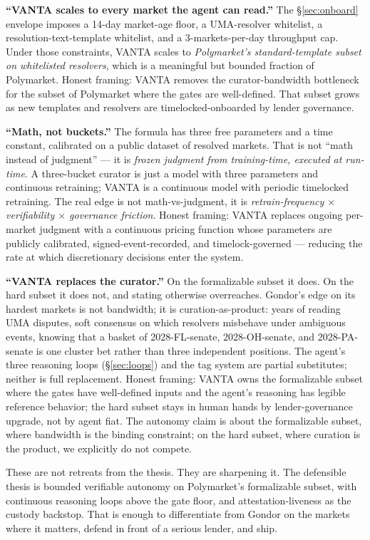 \documentclass[11pt,letterpaper]{article}
\begin{document}
\textbf{``VANTA scales to every market the agent can read.''} The \S\ref{sec:onboard} envelope imposes a 14-day market-age floor, a UMA-resolver whitelist, a resolution-text-template whitelist, and a 3-markets-per-day throughput cap. Under those constraints, VANTA scales to \emph{Polymarket's standard-template subset on whitelisted resolvers}, which is a meaningful but bounded fraction of Polymarket. Honest framing: VANTA removes the curator-bandwidth bottleneck for the subset of Polymarket where the gates are well-defined. That subset grows as new templates and resolvers are timelocked-onboarded by lender governance.

\textbf{``Math, not buckets.''} The formula has three free parameters and a time constant, calibrated on a public dataset of resolved markets. That is not ``math instead of judgment'' --- it is \emph{frozen judgment from training-time, executed at run-time}. A three-bucket curator is just a model with three parameters and continuous retraining; VANTA is a continuous model with periodic timelocked retraining. The real edge is not math-vs-judgment, it is \emph{retrain-frequency $\times$ verifiability $\times$ governance friction}. Honest framing: VANTA replaces ongoing per-market judgment with a continuous pricing function whose parameters are publicly calibrated, signed-event-recorded, and timelock-governed --- reducing the rate at which discretionary decisions enter the system.

\textbf{``VANTA replaces the curator.''} On the formalizable subset it does. On the hard subset it does not, and stating otherwise overreaches. Gondor's edge on its hardest markets is not bandwidth; it is curation-as-product: years of reading UMA disputes, soft consensus on which resolvers misbehave under ambiguous events, knowing that a basket of 2028-FL-senate, 2028-OH-senate, and 2028-PA-senate is one cluster bet rather than three independent positions. The agent's three reasoning loops (\S\ref{sec:loops}) and the tag system are partial substitutes; neither is full replacement. Honest framing: VANTA owns the formalizable subset where the gates have well-defined inputs and the agent's reasoning has legible reference behavior; the hard subset stays in human hands by lender-governance upgrade, not by agent fiat. The autonomy claim is about the formalizable subset, where bandwidth is the binding constraint; on the hard subset, where curation is the product, we explicitly do not compete.

These are not retreats from the thesis. They are sharpening it. The defensible thesis is bounded verifiable autonomy on Polymarket's formalizable subset, with continuous reasoning loops above the gate floor, and attestation-liveness as the custody backstop. That is enough to differentiate from Gondor on the markets where it matters, defend in front of a serious lender, and ship.
\end{document}
